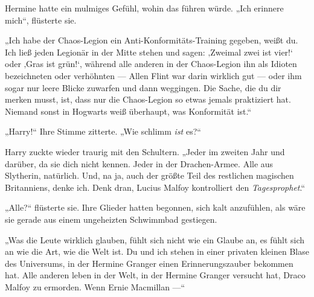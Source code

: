 Hermine hatte ein mulmiges Gefühl, wohin das führen würde.
„Ich erinnere mich“, flüsterte sie.

„Ich habe der Chaos-Legion ein Anti-Konformitäts-Training gegeben, weißt du. Ich ließ jeden Legionär in der Mitte stehen und sagen: ‚Zweimal zwei ist vier!‘ oder ‚Gras ist grün!‘, während alle anderen in der Chaos-Legion ihn als Idioten bezeichneten oder verhöhnten — Allen Flint war darin wirklich gut — oder ihm sogar nur leere Blicke zuwarfen und dann weggingen. Die Sache, die du dir merken musst, ist, dass nur die Chaos-Legion so etwas jemals praktiziert hat. Niemand sonst in Hogwarts weiß überhaupt, was Konformität ist.“

„Harry!“ Ihre Stimme zitterte.
„Wie schlimm \emph{ist} es?“

Harry zuckte wieder traurig mit den Schultern.
„Jeder im zweiten Jahr und darüber, da sie dich nicht kennen. Jeder in der Drachen-Armee. Alle aus Slytherin, natürlich. Und, na ja, auch der größte Teil des restlichen magischen Britanniens, denke ich. Denk dran, Lucius Malfoy kontrolliert den \emph{Tagesprophet}.“

„Alle?“ flüsterte sie. Ihre Glieder hatten begonnen, sich kalt anzufühlen, als wäre sie gerade aus einem ungeheizten Schwimmbad gestiegen.

„Was die Leute wirklich glauben, fühlt sich nicht wie ein Glaube an, es fühlt sich an wie die Art, wie die Welt ist. Du und ich stehen in einer privaten kleinen Blase des Universums, in der Hermine Granger einen Erinnerungszauber bekommen hat. Alle anderen leben in der Welt, in der Hermine Granger versucht hat, Draco Malfoy zu ermorden. Wenn Ernie Macmillan —“

